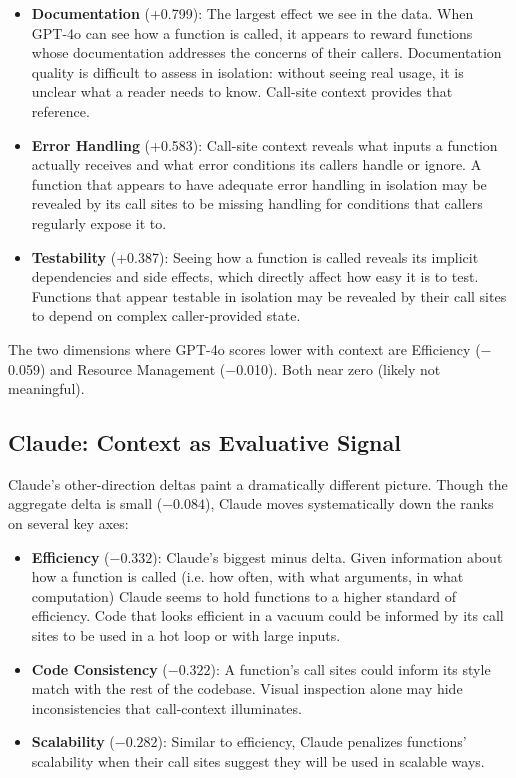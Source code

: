 \documentclass[12pt]{report}
\begin{document}
\begin{itemize}
    \item \textbf{Documentation} (+0.799): The largest effect we see in the data. When GPT-4o can see how a function is called, it appears to reward functions whose documentation addresses the concerns of their callers. Documentation quality is difficult to assess in isolation: without seeing real usage, it is unclear what a reader needs to know. Call-site context provides that reference.
    \item \textbf{Error Handling} (+0.583): Call-site context reveals what inputs a function actually receives and what error conditions its callers handle or ignore. A function that appears to have adequate error handling in isolation may be revealed by its call sites to be missing handling for conditions that callers regularly expose it to.
    \item \textbf{Testability} (+0.387): Seeing how a function is called reveals its implicit dependencies and side effects, which directly affect how easy it is to test. Functions that appear testable in isolation may be revealed by their call sites to depend on complex caller-provided state.
\end{itemize}

The two dimensions where GPT-4o scores lower with context are Efficiency ($-$0.059) and Resource Management ($-$0.010). Both near zero (likely not meaningful).

\subsection{Claude: Context as Evaluative Signal}

Claude's other-direction deltas paint a dramatically different picture. Though the aggregate delta is small ($-0.084$), Claude moves systematically down the ranks on several key axes:

\begin{itemize} 
\item \textbf{Efficiency} ($-0.332$): Claude's biggest minus delta. Given information about how a function is called (i.e. how often, with what arguments, in what computation) Claude seems to hold functions to a higher standard of efficiency. Code that looks efficient in a vacuum could be informed by its call sites to be used in a hot loop or with large inputs.
\item \textbf{Code Consistency} ($-0.322$): A function's call sites could inform its style match with the rest of the codebase. Visual inspection alone may hide inconsistencies that call-context illuminates.
\item \textbf{Scalability} ($-0.282$): Similar to efficiency, Claude penalizes functions' scalability when their call sites suggest they will be used in scalable ways.
\end{itemize} 
\end{document}
